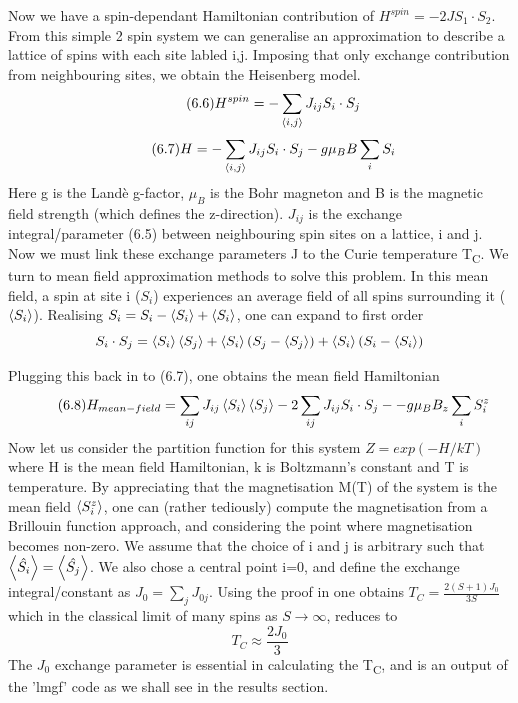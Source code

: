 \documentclass[12pt]{article}
\begin{document}
Now we have a spin-dependant Hamiltonian contribution of $H^{spin}=-2JS_1\cdot S_2$. From this simple 2 spin system we can generalise an approximation to describe a lattice of spins with each site labled i,j. Imposing that only exchange contribution from neighbouring sites, we obtain the Heisenberg model.
\begin{equation} \label{4.1} \tag{6.6}
H^{spin}=-\sum_{\expval{i,j}}J_{ij}S_i \cdot S_j
\end{equation}
\begin{equation} \label{4.1} \tag{6.7}
H=-\sum_{\expval{i,j}}J_{ij}S_i \cdot S_j-g\mu_BB\sum_iS_i
\end{equation}
Here g is the Landè g-factor, $\mu_B$ is the Bohr magneton and B is the magnetic field strength (which defines the z-direction). $J_{ij}$ is the exchange integral/parameter (6.5) between neighbouring spin sites on a lattice, i and j.
\\
Now we must link these exchange parameters J to the Curie temperature T\textsubscript{C}. We turn to mean field approximation methods to solve this problem. In this mean field, a spin at site i ($S_i$) experiences an average field of all spins surrounding it ($\expval{S_i}$). Realising $S_i=S_i-\expval{S_i}+\expval{S_i}$, one can expand to first order
$$S_i\cdot S_j=\expval{S_i}\expval{S_j}+\expval{S_i}(S_j-\expval{S_j}) + \expval{S_i}(S_i-\expval{S_i})$$

Plugging this back in to (6.7), one obtains the mean field Hamiltonian
\begin{equation} \label{4.1} \tag{6.8}
H_{mean-field}=\sum_{ij}J_{ij}\expval{S_i}\expval{S_j}-2\sum_{ij}J_{ij}S_i\cdot S_j--g\mu_BB_z\sum_iS^z_i
\end{equation}
Now let us consider the partition function for this system $Z=exp(-H/kT)$ where H is the mean field Hamiltonian, k is Boltzmann's constant and T is temperature. By appreciating that the magnetisation M(T) of the system is the mean field $\expval{S^z_i}$, one can (rather tediously) compute the magnetisation from a Brillouin function approach, and considering the point where magnetisation becomes non-zero. We assume that the choice of i and j is arbitrary such that $\expval{\hat{S_i}}=\expval{\hat{S_j}}$. We also chose a central point i=0, and define the exchange integral/constant as $J_0=\sum_jJ_{0j}$. Using the proof in \cite{meanfield}
one obtains $T_C=\frac{2(S+1)J_0}{3S}$ which in the classical limit of many spins as $S\rightarrow \infty $, reduces to
\begin{equation} \label{4.1} \tag{6.9}
T_C\approx\frac{2J_0}{3}
\end{equation}
The $J_0$ exchange parameter is essential in calculating the T\textsubscript{C}, and is an output of the 'lmgf' code as we shall see in the results section.
\clearpage
\end{document}
